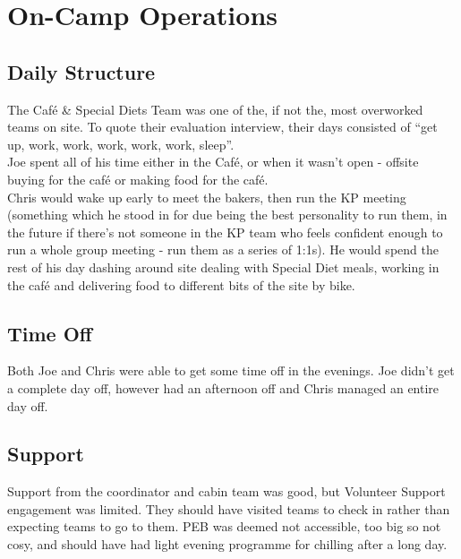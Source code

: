 \section{On-Camp Operations}
\subsection{Daily Structure}
The Café \& Special Diets Team was one of the, if not the, most overworked teams on site. To quote their evaluation interview, their days consisted of ``get up, work, work, work, work, work, sleep''.\\

Joe spent all of his time either in the Café, or when it wasn't open - offsite buying for the café or making food for the café.\\

Chris would wake up early to meet the bakers, then run the KP meeting (something which he stood in for due being the best personality to run them, in the future if there's not someone in the KP team who feels confident enough to run a whole group meeting - run them as a series of 1:1s). He would spend the rest of his day dashing around site dealing with Special Diet meals, working in the café and delivering food to different bits of the site by bike.
\subsection{Time Off}
Both Joe and Chris were able to get some time off in the evenings. Joe didn't get a complete day off, however had an afternoon off and Chris managed an entire day off. 
\subsection{Support}
Support from the coordinator and cabin team was good, but Volunteer Support engagement was limited. They should have visited teams to check in rather than expecting teams to go to them. PEB was deemed not accessible, too big so not cosy, and should have had light evening programme for chilling after a long day.

